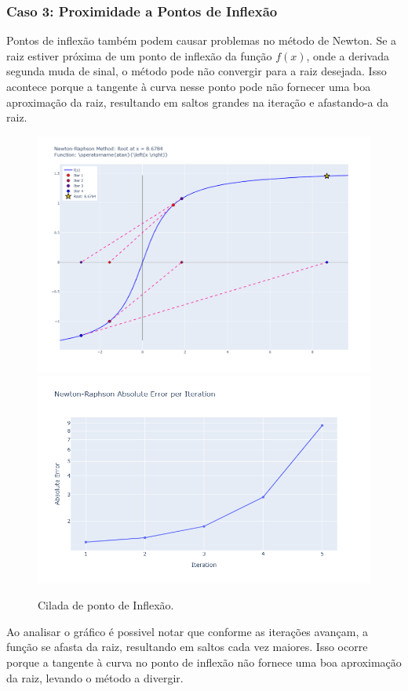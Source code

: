 \subsubsection{Caso 3: Proximidade a Pontos de Inflexão}
Pontos de inflexão também podem causar problemas no método de Newton. Se a raiz estiver próxima de um ponto de inflexão da função \(f(x)\), onde a derivada segunda muda de sinal, o método pode não convergir para a raiz desejada. Isso acontece porque a tangente à curva nesse ponto pode não fornecer uma boa aproximação da raiz, resultando em saltos grandes na iteração e afastando-a da raiz.
\begin{figure}[H]
    \centering 
    \includegraphics[width=1\textwidth]{Imagens/pitfalls/04/arctg.png}
    \includegraphics[width=1\textwidth]{Imagens/pitfalls/04/err_arctg.png}
    \caption{Cilada de ponto de Inflexão.}
    \label{fig:ciladaPontoInflexao}
\end{figure}
Ao analisar o gráfico é possivel notar que conforme as iterações avançam, a função se afasta da raiz, resultando em saltos cada vez maiores. Isso ocorre porque a tangente à curva no ponto de inflexão não fornece uma boa aproximação da raiz, levando o método a divergir.


